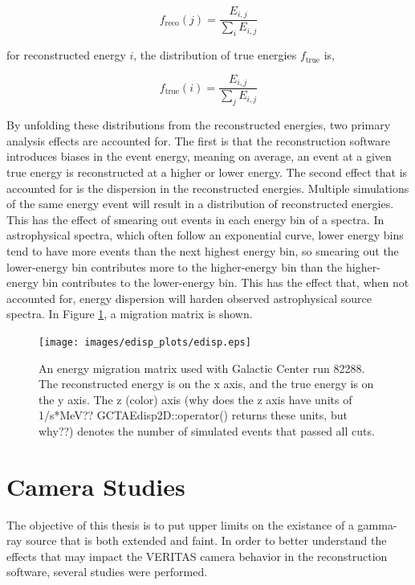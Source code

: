     \begin{equation}
      \label{eqn:edispreco}
      f_{\text{reco}}(j)=\frac{E_{i,j}}{ \sum_{i}E_{i,j} }
    \end{equation}

    for reconstructed energy $i$, the distribution of true energies $f_{\text{true}}$ is,

    \begin{equation}
      \label{eqn:edisptrue}
      f_{\text{true}}(i)=\frac{E_{i,j}}{ \sum_{j}E_{i,j} }
    \end{equation}

    By unfolding these distributions from the reconstructed energies, two primary analysis effects are accounted for.
    The first is that the reconstruction software introduces biases in the event energy, meaning on average, an event at a given true energy is reconstructed at a higher or lower energy.
    The second effect that is accounted for is the dispersion in the reconstructed energies.
    Multiple simulations of the same energy event will result in a distribution of reconstructed energies.
    This has the effect of smearing out events in each energy bin of a spectra.
    In astrophysical spectra, which often follow an exponential curve, lower energy bins tend to have more events than the next highest energy bin, so smearing out the lower-energy bin contributes more to the higher-energy bin than the higher-energy bin contributes to the lower-energy bin.
    This has the effect that, when not accounted for, energy dispersion will harden observed astrophysical source spectra.
    In Figure \ref{fig:migmatrix}, a migration matrix is shown.

    \begin{figure}[ht]
      \centering
      \texttt{[image: images/edisp\_plots/edisp.eps]}
      \caption[Energy Migration Matrix]{
        An energy migration matrix used with Galactic Center run 82288.
        The reconstructed energy is on the x axis, and the true energy is on the y axis.
        The z (color) axis (why does the z axis have units of 1/s*MeV?? GCTAEdisp2D::operator() returns these units, but why??) denotes the number of simulated events that passed all cuts.
      }
      \label{fig:migmatrix}
    \end{figure}

\section{Camera Studies}
  The objective of this thesis is to put upper limits on the existance of a gamma-ray source that is both extended and faint.
  In order to better understand the effects that may impact the VERITAS camera behavior in the reconstruction software, several studies were performed.

